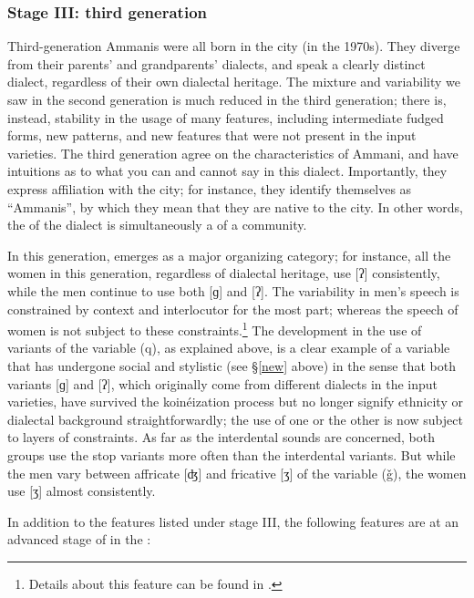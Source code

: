 \documentclass[output=paper]{langsci/langscibook}
\begin{document}
\subsubsection{Stage III: third generation}

Third-generation Ammanis were all born in the city (in the 1970s). They diverge from their parents’ and grandparents’ dialects, and speak a clearly distinct dialect, regardless of their own dialectal heritage. The mixture and variability we saw in the second generation is much reduced in the third generation; there is, instead, stability in the usage of many features, including intermediate fudged forms, new patterns, and new features that were not present in the input varieties. The third generation agree on the characteristics of Ammani, and have intuitions as to what you can and cannot say in this dialect. Importantly, they express affiliation with the city; for instance, they identify themselves as ``Ammanis'', by which they mean that they are native to the city. In other words, the  of the dialect is simultaneously a  of a community.

In this generation,  emerges as a major organizing category; for instance, all the women in this generation, regardless of dialectal heritage, use [ʔ] consistently, while the men continue to use both [ɡ] and [ʔ]. The variability in men’s speech is constrained by context and interlocutor for the most part; whereas the speech of women is not subject to these constraints.\footnote{Details about this feature can be found in \citet{Al-WerHerin2011}.} The development in the use of variants of the variable (q), as explained above, is a clear example of a variable that has undergone social and stylistic  (see §\ref{new} above) in the sense that both variants [ɡ] and [ʔ], which originally come from different dialects in the input varieties, have survived the koinéization process but no longer signify ethnicity or dialectal background straightforwardly; the use of one or the other is now subject to layers of constraints. As far as the interdental sounds are concerned, both  groups use the stop variants more often than the interdental variants. But while the men vary between affricate [ʤ] and fricative [ʒ] of the variable (ǧ), the women use [ʒ] almost consistently.

In addition to the features listed under stage III, the following features are at an advanced stage of  in the :
\end{document}
